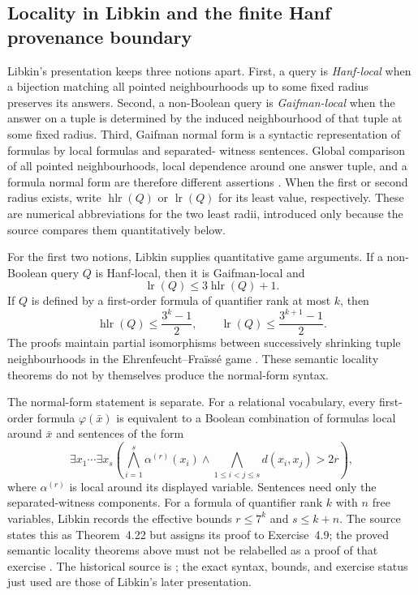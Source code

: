 
\subsection{Locality in Libkin and the finite Hanf provenance boundary}
\label{sec:p09-presentation-n-c-003}

Libkin's presentation keeps three notions apart.  First, a query is
\emph{Hanf-local} when a bijection matching all pointed neighbourhoods up to
some fixed radius preserves its answers.  Second, a non-Boolean query is
\emph{Gaifman-local} when the answer on a tuple is determined by the induced
neighbourhood of that tuple at some fixed radius.  Third, Gaifman normal form
is a syntactic representation of formulas by local formulas and separated-
witness sentences.  Global comparison of all pointed neighbourhoods, local
dependence around one answer tuple, and a formula normal form are therefore
different assertions \cite[defs.~4.6--4.7 and thm.~4.22]{Libkin2004}.
When the first or second radius exists, write \(\operatorname{hlr}(Q)\) or
\(\operatorname{lr}(Q)\) for its least value, respectively.  These are
numerical abbreviations for the two least radii, introduced only because the
source compares them quantitatively below.

For the first two notions, Libkin supplies quantitative game arguments.  If a
non-Boolean query \(Q\) is Hanf-local, then it is Gaifman-local and
\[
 \operatorname{lr}(Q)\leq 3\operatorname{hlr}(Q)+1.
\]
If \(Q\) is defined by a first-order formula of quantifier rank at most \(k\),
then
\[
 \operatorname{hlr}(Q)\leq \frac{3^k-1}{2},
 \qquad
 \operatorname{lr}(Q)\leq \frac{3^{k+1}-1}{2}.
\]
The proofs maintain partial isomorphisms between successively shrinking tuple
neighbourhoods in the Ehrenfeucht--Fra\"iss\'e game
\cite[thms.~4.11--4.12]{Libkin2004}.  These semantic locality theorems do not by
themselves produce the normal-form syntax.

The normal-form statement is separate.  For a relational vocabulary, every
first-order formula \(\varphi(\bar x)\) is equivalent to a Boolean combination
of formulas local around \(\bar x\) and sentences of the form
\[
 \exists x_1\cdots\exists x_s
 \left(
   \bigwedge_{i=1}^{s}\alpha^{(r)}(x_i)
   \land
   \bigwedge_{1\leq i<j\leq s}d(x_i,x_j)>2r
 \right),
\]
where \(\alpha^{(r)}\) is local around its displayed variable.  Sentences need
only the separated-witness components.  For a formula of quantifier rank
\(k\) with \(n\) free variables, Libkin records the effective bounds
\(r\leq7^k\) and \(s\leq k+n\).  The source states this as Theorem~4.22 but
assigns its proof to Exercise~4.9; the proved semantic locality theorems above
must not be relabelled as a proof of that exercise
\cite[pp.~60--63]{Libkin2004}.  The historical source is
\textcite{Gaifman1982}; the exact syntax, bounds, and exercise status just used
are those of Libkin's later presentation.

